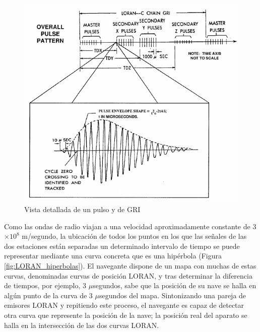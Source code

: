 \begin{figure}[!h]
     \centering
     \includegraphics[width=\textwidth]{06.radionavegacion/Imagenes/06.01.Loran/Loran_vista_detallada_pulso_+GRI.png}
     \caption{Vista detallada de un pulso y de GRI \protect\cite{LoranC_user_book}}
     \label{fig:06.loran.vista.detallada.pulso.y.gri}
   \end{figure}





Como las ondas de radio viajan a una velocidad aproximadamente constante de 3$ \times 10^8$ m/segundo, la ubicaci\'on de todos los puntos en los que las se\~nales de las dos estaciones est\'an separadas un determinado intervalo de tiempo se puede representar mediante una curva concreta que es una hip\'erbola (Figura \ref{fig:LORAN_hiperbolas}). El navegante dispone de un mapa con muchas de estas curvas, denominadas curvas de posici\'on LORAN, y tras determinar la diferencia de tiempos, por ejemplo, 3 $\mu$segundos, sabe que la posici\'on de su nave se halla en alg\'un punto de la curva de 3 $\mu$segundos del mapa. Sintonizando una pareja de emisores LORAN y repitiendo este proceso, el navegante es capaz de detectar otra curva que represente la posici\'on de la nave; la posici\'on real del aparato se halla en la intersecci\'on de las dos curvas LORAN. 


